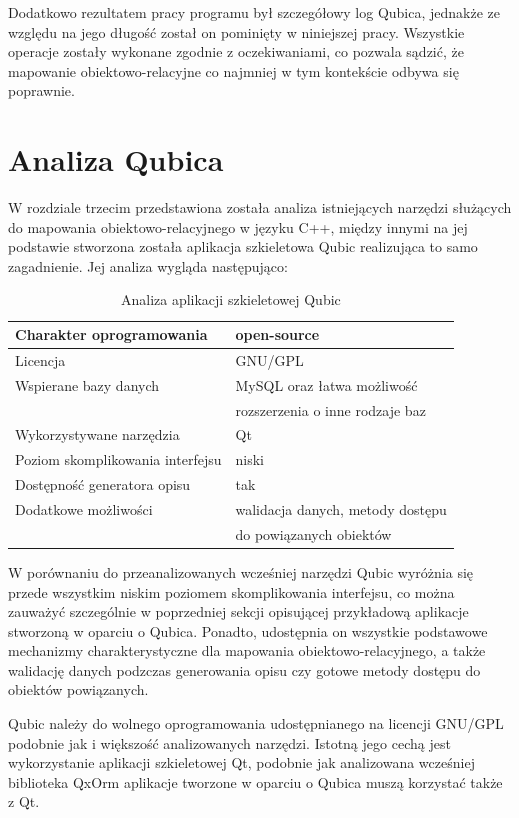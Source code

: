 \documentclass[12pt]{report}
\begin{document}
Dodatkowo rezultatem pracy programu był szczegółowy log Qubica, jednakże ze względu na jego długość został on pominięty w niniejszej pracy. Wszystkie operacje zostały
wykonane zgodnie z oczekiwaniami, co pozwala sądzić, że mapowanie obiektowo-relacyjne co najmniej w tym kontekście odbywa się poprawnie.

\section{Analiza Qubica}

W rozdziale trzecim przedstawiona została analiza istniejących narzędzi służących do mapowania obiektowo-relacyjnego w języku C++, między innymi na jej podstawie
stworzona została aplikacja szkieletowa Qubic realizująca to samo zagadnienie. Jej analiza wygląda następująco:

\begin{table}[h]
\centering
\begin{tabular}{| l | l |} 
\hline 
Charakter oprogramowania & open-source \\ \hline
Licencja & GNU/GPL  \\ \hline
Wspierane bazy danych & MySQL oraz łatwa możliwość \\ \hline
&  rozszerzenia o inne rodzaje baz \\ \hline
Wykorzystywane narzędzia & Qt  \\ \hline
Poziom skomplikowania interfejsu & niski  \\ \hline
Dostępność generatora opisu & tak  \\ \hline
Dodatkowe możliwości &  walidacja danych, metody dostępu  \\ \hline
& do powiązanych obiektów \\ \hline
\end{tabular} 
\caption{Analiza aplikacji szkieletowej Qubic}
\end{table}

W porównaniu do przeanalizowanych wcześniej narzędzi Qubic wyróżnia się przede wszystkim niskim poziomem skomplikowania interfejsu, co można zauważyć szczególnie w
poprzedniej sekcji opisującej przykładową aplikacje stworzoną w oparciu o Qubica. Ponadto, udostępnia on wszystkie podstawowe mechanizmy charakterystyczne dla mapowania
obiektowo-relacyjnego, a także walidację danych podzczas generowania opisu czy gotowe metody dostępu do obiektów powiązanych. 

Qubic należy do wolnego oprogramowania udostępnianego na licencji GNU/GPL podobnie jak i większość analizowanych narzędzi. Istotną jego cechą jest wykorzystanie aplikacji
szkieletowej Qt, podobnie jak analizowana wcześniej biblioteka QxOrm aplikacje tworzone w oparciu o Qubica muszą korzystać także z Qt. 
\end{document}
